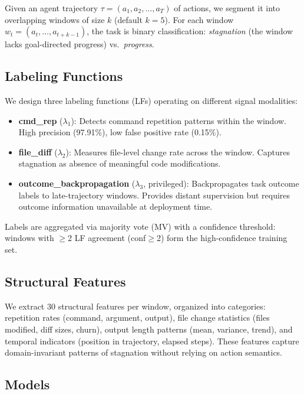\documentclass[11pt,a4paper]{article}
\begin{document}
Given an agent trajectory $\tau = (a_1, a_2, \ldots, a_T)$ of actions, we segment it into overlapping windows of size $k$ (default $k{=}5$). For each window $w_t = (a_{t}, \ldots, a_{t+k-1})$, the task is binary classification: \emph{stagnation} (the window lacks goal-directed progress) vs.\ \emph{progress}.

\subsection{Labeling Functions}

We design three labeling functions (LFs) operating on different signal modalities:

\begin{itemize}
\item \textbf{cmd\_rep} ($\lambda_1$): Detects command repetition patterns within the window. High precision (97.91\%), low false positive rate (0.15\%).
\item \textbf{file\_diff} ($\lambda_2$): Measures file-level change rate across the window. Captures stagnation as absence of meaningful code modifications.
\item \textbf{outcome\_backpropagation} ($\lambda_3$, privileged): Backpropagates task outcome labels to late-trajectory windows. Provides distant supervision but requires outcome information unavailable at deployment time.
\end{itemize}

Labels are aggregated via majority vote (MV) with a confidence threshold: windows with $\geq$2 LF agreement (conf$\geq$2) form the high-confidence training set.

\subsection{Structural Features}

We extract 30 structural features per window, organized into categories: repetition rates (command, argument, output), file change statistics (files modified, diff sizes, churn), output length patterns (mean, variance, trend), and temporal indicators (position in trajectory, elapsed steps). These features capture domain-invariant patterns of stagnation without relying on action semantics.

\subsection{Models}
\end{document}
